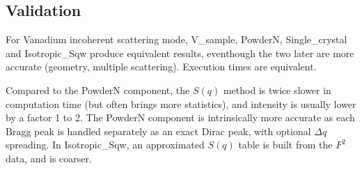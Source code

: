 \subsection{Validation}
For Vanadium incoherent scattering mode, V\_sample, PowderN, Single\_crystal and Isotropic\_Sqw produce equivalent results, eventhough the two later are more accurate (geometry, multiple scattering). Execution times are equivalent.

Compared to the PowderN component, the $S(q)$ method is twice slower in computation time (but often brings more statistics), and intensity is usually lower by a factor 1 to 2. The PowderN component is intrinsically more accurate as each Bragg peak is handled separately as an exact Dirac peak, with optional $\Delta q$ spreading. In Isotropic\_Sqw, an approximated $S(q)$ table is built from the $F^2$ data, and is coarser.



